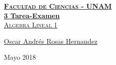 \documentclass[12pt, fleqn]{article}                             %
\author{Oscar Andrés Rosas}                                     %
\theoremstyle{break}                                            %
\begin{document}
\begin{titlepage}
    
    \pagecolor{TitlePageColor}                                      %
    \color{white}                                                   %

    \vspace                                                         %
    \baselineskip                                                   %

    \makebox[0pt][l]{\rule{1.3\textwidth}{3pt}}                     %
    
    \href{https://compilandoconocimiento.com}                       %
    {\textbf{\textsc{\Huge Facultad de Ciencias - UNAM}}}\\[2.7cm]  %

    \href{\ProjectNameLink/LibroAlgebraLineal}                      %
    {\fontsize{65}{78}\selectfont \textbf{3 Tarea-Examen}\\[0.5cm]  %
    \textcolor{ColorSubtext}{\textsc{\Huge Algebra Lineal 1 }}}     %
    
    \vfill                                                          %
    
    \href{\ProjectAuthorLink}                                       %
    {\LARGE \textsf{Oscar Andrés Rosas Hernandez}}                  %

    \vspace                                                         %
    \baselineskip                                                   %
    
    {\large \textsf{Mayo 2018}}                                     %
 
\end{titlepage}
\end{document}
